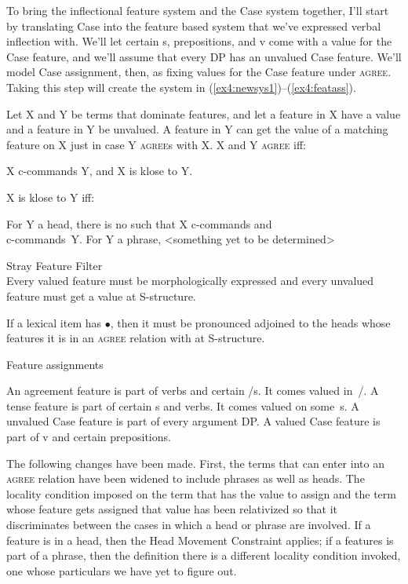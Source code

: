 To bring the inflectional feature system and the Case system together, I'll start by translating Case into the feature based system that we've expressed verbal inflection with. We'll let certain s, prepositions, and v come with a value for the Case feature, and we'll assume that every DP has an unvalued Case feature. We'll model Case assignment, then, as fixing values for the Case feature under \textsc{agree}. Taking this step will create the system in (\ref{ex4:newsys1})--(\ref{ex4:featass}).
\enlargethispage*{20pt}
\begin{exe}
\ex \label{ex4:newsys1}
 Let X and Y be terms that dominate features, and let a feature in X have a value and a feature in Y be unvalued. A feature in Y can get the value of a matching feature on X just in case Y \textsc{agree}s with X. X and Y \textsc{agree} iff:
\begin{xlist}
	\ex X c-commands Y, and
	\ex X is klose to Y.
\end{xlist}

	\ex X is klose to Y iff:
	\begin{xlist}
	\ex For Y a head, there is no  such that X c-commands  and \\ c-commands~Y.
	\ex For Y a phrase, <something yet to be determined>
\end{xlist}

	\ex Stray Feature Filter\\
	Every valued feature must be morphologically expressed and every unvalued feature must get a value at S-structure.

	\ex If a lexical item has $\bullet$, then it must be pronounced adjoined to the heads whose features it is in an \textsc{agree} relation with at S-structure.

	\ex Feature assignments \label{ex4:featass}
	\begin{xlist}
	\ex An agreement feature is part of verbs and certain /s. It comes valued in~/.
	\ex A tense feature is part of certain s and verbs. It comes valued on some~s.
	\ex A unvalued Case feature is part of every argument DP.
	\ex \label{ex4:newsys1end} A valued Case feature is part of v and certain prepositions.
	\end{xlist}
\end{exe}
The following changes have been made. First, the terms that can enter into an \textsc{agree} relation have been widened to include phrases as well as heads. The locality condition imposed on the term that has the value to assign and the term whose feature gets assigned that value has been relativized so that it discriminates between the cases in which a head or phrase are involved. If a feature is in a head, then the Head Movement Constraint applies; if a features is part of a phrase, then the definition there is a different locality condition invoked, one whose particulars we have yet to figure out.

